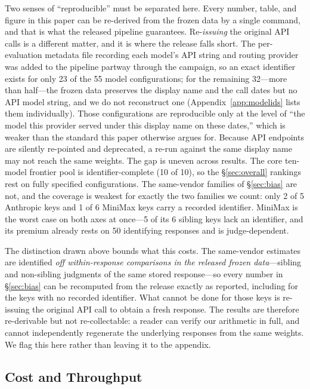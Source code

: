 \documentclass{article}
\begin{document}
Two senses of ``reproducible'' must be separated here. Every number, table, and figure in this
paper can be re-derived from the frozen data by a single command, and that is what the released
pipeline guarantees. Re-\emph{issuing} the original API calls is a different matter, and it is
where the release falls short. The per-evaluation metadata
file recording each model's API string and routing provider was added to the pipeline partway
through the campaign, so an exact identifier exists for only 23 of the 55 model configurations;
for the remaining 32---more than half---the frozen data preserves the display name and the call
dates but no API model string, and we do not reconstruct one (Appendix~\ref{app:modelids} lists
them individually). Those configurations are reproducible only at the level of ``the model this
provider served under this display name on these dates,'' which is weaker than the standard this
paper otherwise argues for. Because API endpoints are silently re-pointed and deprecated, a
re-run against the same display name may not reach the same weights. The gap is uneven across
results. The core ten-model frontier pool is identifier-complete (10 of 10), so the
\S\ref{sec:overall} rankings rest on fully specified configurations. The same-vendor families of
\S\ref{sec:bias} are not, and the coverage is weakest for exactly the two families we count:
only 2 of 5 Anthropic keys and 1 of 6 MiniMax keys carry a recorded identifier. MiniMax is the
worst case on both axes at once---5 of its 6 sibling keys lack an identifier, and its premium
already rests on 50 identifying responses and is judge-dependent.

The distinction drawn above bounds what this costs. The same-vendor estimates are identified
\emph{off within-response comparisons in the released frozen data}---sibling and non-sibling
judgments of the same stored response---so every number in \S\ref{sec:bias} can be recomputed
from the release exactly as reported, including for the keys with no recorded identifier. What
cannot be done for those keys is re-issuing the original API call to obtain a fresh response.
The results are therefore re-derivable but not re-collectable: a reader can verify our arithmetic
in full, and cannot independently regenerate the underlying responses from the same weights. We
flag this here rather than leaving it to the appendix.

\subsection{Cost and Throughput}
\end{document}
